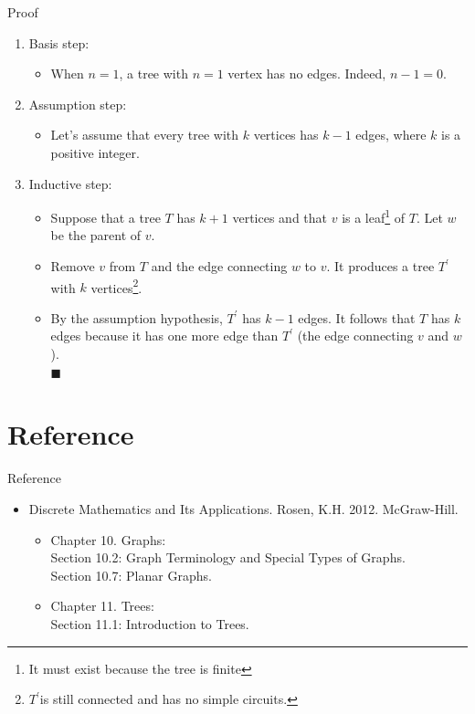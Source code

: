 \documentclass{beamer}
\theoremstyle{definition}
\begin{document}
\begin{frame}{Proof}
    \begin{enumerate}[<+->]
        \item Basis step: 
        \begin{itemize}
            \item When $n = 1$, a tree with $n = 1$ vertex has no edges.  Indeed, $n -1 = 0$.
        \end{itemize}
        \item Assumption step:
        \begin{itemize}
            \item Let's assume that every tree with $k$ vertices has $k - 1$ edges, where $k$ is a positive integer.
        \end{itemize}
        \item Inductive step: 
        \begin{itemize}
            \item Suppose that a tree $T$ has $k + 1$ vertices and that $v$ is a leaf\footnote{{\tiny It must exist because the tree is finite}} of $T$.  Let $w$ be the parent of $v$. 
            \item Remove $v$ from $T$ and the edge connecting $w$ to $v$. It produces a tree $T^\prime$ with $k$ vertices\footnote{ {\tiny $T^\prime$is still connected and has no simple circuits.}}. 
            \item By the assumption hypothesis, $T^\prime$ has $k - 1$ edges. It follows that $T$ has $k$ edges because it has one more edge than $T^\prime$ (the edge connecting $v$ and $w$). \\ \hspace{10cm} {\tiny $\blacksquare$}
        \end{itemize}
    \end{enumerate}
\end{frame}

\section*{Reference}

\begin{frame}{Reference}
    \begin{itemize}
        \item Discrete Mathematics and Its Applications. Rosen, K.H. 2012. McGraw-Hill. \\
        \begin{itemize}
         \item Chapter 10. Graphs: \\
            Section 10.2: Graph Terminology and Special Types of Graphs. \\
            Section 10.7: Planar Graphs. 
        \end{itemize}
        \begin{itemize}
         \item Chapter 11. Trees: \\
            Section 11.1: Introduction to Trees.
        \end{itemize}
    \end{itemize}
\end{frame}
\end{document}
